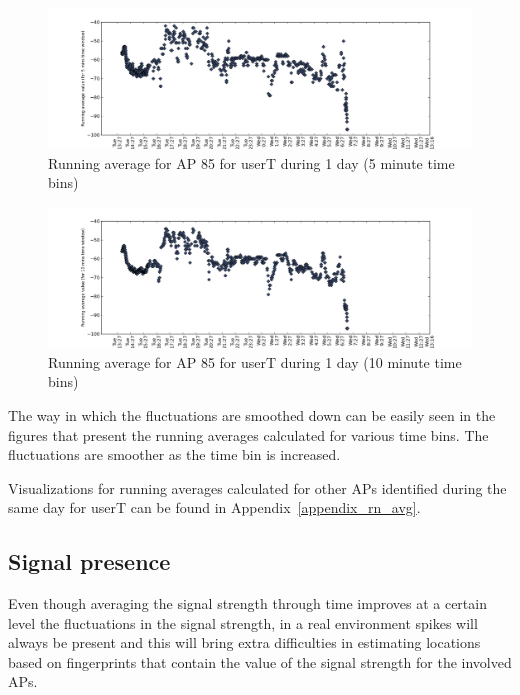 \begin{figure}[!h]
\centering
\includegraphics[width
=\textwidth]{figures/rn_avg/user_1_sorted_1days_plot_85_rn_avg_sig_5.png}
\caption{Running average for AP 85 for userT during 1 day (5 minute time bins)}
\label{user_1_AP85_rn5avg_1d}
\end{figure}

\begin{figure}[!h]
\centering
\includegraphics[width
=\textwidth]{figures/rn_avg/user_1_sorted_1days_plot_85_rn_avg_sig_10.png}
\caption{Running average for AP 85 for userT during 1 day (10 minute time bins)}
\label{user_1_AP85_rn10avg_1d}
\end{figure}

The way in which the fluctuations are smoothed down can be easily seen in the
figures that present the running averages calculated for various time bins. The
fluctuations are smoother as the time bin is increased.

Visualizations for running averages calculated for other APs identified during
the same day for userT can be found in Appendix~\ref{appendix_rn_avg}.

\subsection{Signal presence}

Even though averaging the signal strength through time improves at a certain
level the fluctuations in the signal strength, in a real environment spikes will
always be present and this will bring extra difficulties in estimating locations
based on fingerprints that contain the value of the signal strength for the
involved APs.

